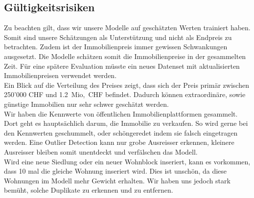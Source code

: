 \subsection{Gültigkeitsrisiken}
Zu beachten gilt, dass wir unsere Modelle auf geschätzten Werten trainiert haben. Somit sind unsere Schätzungen als Unterstützung und nicht als Endpreis zu betrachten. Zudem ist der Immobilienpreis immer gewissen Schwankungen ausgesetzt. Die Modelle schätzen somit die Immobilienpreise in der gesammelten Zeit. Für eine spätere Evaluation müsste ein neues Datenset mit aktualisierten Immobilienpreisen verwendet werden.\\
Ein Blick auf die Verteilung des Preises zeigt, dass sich der Preis primär zwischen 250'000 CHF und 1.2~Mio,~CHF befindet. Dadurch können extraordinäre, sowie günstige  Immobilien nur sehr schwer geschätzt werden.\\[2ex]
%
Wir haben die Kennwerte von öffentlichen Immobilienplattformen gesammelt. Dort geht es hauptsächlich darum, die Immobilie zu verkaufen. So wird gerne bei den Kennwerten geschummelt, oder schöngeredet indem sie falsch eingetragen werden. Eine Outlier Detection kann nur grobe Ausreisser erkennen, kleinere Ausreisser bleiben somit unentdeckt und verfälschen das Modell.\\
Wird eine neue Siedlung oder ein neuer Wohnblock inseriert, kann es vorkommen, dass 10 mal die gleiche Wohnung inseriert wird. Dies ist unschön, da diese Wohnungen im Modell mehr Gewicht erhalten. Wir haben uns jedoch stark bemüht, solche Duplikate zu erkennen und zu entfernen.


